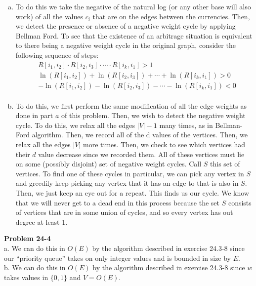 \documentclass{article}
\begin{document}
\begin{enumerate}[a.]
\item
To do this we take the negative of the natural log (or any other base will also work) of all the values $c_i$ that are on the edges between the currencies. Then, we detect the presence or absence of a negative weight cycle by applying Bellman Ford. To see that the existence of an arbitrage situation is equivalent to there being a negative weight cycle in the original graph, consider the following sequence of steps:
\begin{align*}
&R[i_1,i_2]\cdot R[i_2,i_3] \cdot \cdots \cdot R[i_k,i_1] >1\\
&\ln(R[i_1,i_2])+\ln( R[i_2,i_3]) + \cdots +\ln( R[i_k,i_1]) >0\\
&-\ln(R[i_1,i_2])-\ln( R[i_2,i_3]) - \cdots -\ln( R[i_k,i_1]) <0\\
\end{align*}
\item
To do this, we first perform the same modification of all the edge weights as done in part $a$ of this problem. Then, we wish to detect the negative weight cycle. To do this, we relax all the edges $|V|-1$ many times, as in Bellman-Ford algorithm. Then, we record all of the d values of the vertices. Then, we relax all the edges $|V|$ more times. Then, we check to see which vertices had their $d$ value decrease since we recorded them. All of these vertices must lie on some (possibly disjoint) set of negative weight cycles. Call $S$ this set of vertices. To find one of these cycles in particular, we can pick any vertex in $S$ and greedily keep picking any vertex that it has an edge to that is also in $S$. Then, we just keep an eye out for a repeat. This finds us our cycle. We know that we will never get to a dead end in this process because the set $S$ consists of vertices that are in some union of cycles, and so every vertex has out degree at least 1.
\end{enumerate}

\noindent\textbf{Problem 24-4}\\

a. We can do this in $O(E)$ by the algorithm described in exercise 24.3-8 since our ``priority queue'' takes on only integer values and is bounded in size by $E$.\\

b. We can do this in $O(E)$ by the algorithm described in exercise 24.3-8 since $w$ takes values in $\{0,1\}$ and $V = O(E)$. \\
\end{document}
